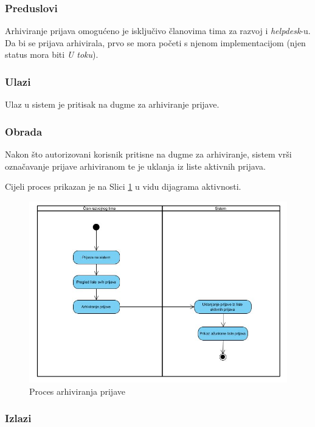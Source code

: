 \documentclass[12pt,a4paper]{article}
\begin{document}
\subsubsection{Preduslovi}

Arhiviranje prijava omogućeno je isključivo članovima tima za razvoj i \textit{helpdesk}-u. Da bi se prijava arhivirala, prvo se mora početi s njenom implementacijom (njen status mora biti \textit{U toku}).

\subsubsection{Ulazi}

Ulaz u sistem je pritisak na dugme za arhiviranje prijave.

\subsubsection{Obrada}

Nakon što autorizovani korisnik pritisne na dugme za arhiviranje, sistem vrši označavanje prijave arhiviranom te je uklanja iz liste aktivnih prijava.

Cijeli proces prikazan je na Slici \ref{act6} u vidu dijagrama aktivnosti.

\begin{figure}[H]
\center
\includegraphics[scale=0.5]{../res/Activity/activity6.JPG}
\caption{Proces arhiviranja prijave}
\label{act6}
\end{figure}

\subsubsection{Izlazi}
\end{document}
